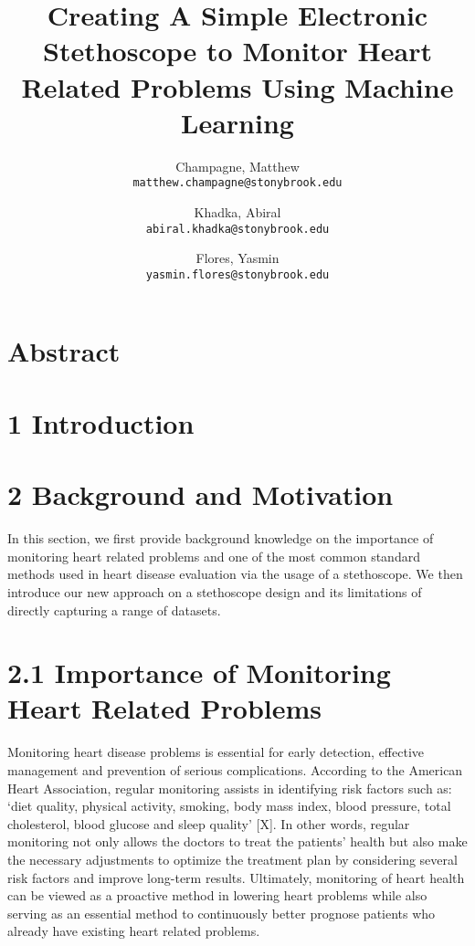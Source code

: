 \documentclass[twocolumn]{article}
\begin{document}
\title{Creating A Simple Electronic Stethoscope to Monitor Heart Related Problems Using Machine Learning}
\author{
  Champagne, Matthew \\
  \texttt{matthew.champagne@stonybrook.edu}
  \and
  Khadka, Abiral \\
  \texttt{abiral.khadka@stonybrook.edu}
  \and
  Flores, Yasmin \\
  \texttt{yasmin.flores@stonybrook.edu}
}

\maketitle
\section{Abstract} 

\section{1 Introduction}

\section{2 Background and Motivation} 
In this section, we first provide background knowledge on the importance of monitoring heart related problems and one of the most common standard methods used in heart disease evaluation via the usage of a stethoscope. We then introduce our new approach on a stethoscope design and its limitations of directly capturing a range of datasets.

\section{2.1 Importance of Monitoring Heart Related Problems} 
Monitoring heart disease problems is essential for early detection, effective management and prevention of serious complications. According to the American Heart Association, regular monitoring assists in identifying risk factors such as: ‘diet quality, physical activity, smoking, body mass index, blood pressure, total cholesterol, blood glucose and sleep quality’ [X]. In other words, regular monitoring not only allows the doctors to treat the patients’ health but also make the necessary adjustments to optimize the treatment plan by considering several risk factors and improve long-term results. Ultimately, monitoring of heart health can be viewed as a proactive method in lowering heart problems while also serving as an essential method to continuously better prognose patients who already have existing heart related problems. 
\end{document}
